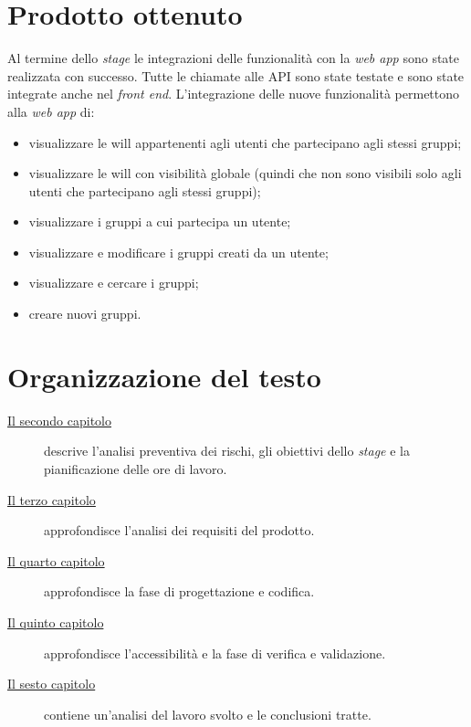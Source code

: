 \section{Prodotto ottenuto}
Al termine dello \textit{stage} le integrazioni delle funzionalità con la
\textit{web app} sono state realizzata con successo. Tutte le chiamate alle
\gls{API}
sono state testate e sono state integrate anche nel \textit{front end}.
L'integrazione delle nuove funzionalità permettono alla \textit{web app} di:
\begin{itemize}
      \item  visualizzare le \gls{will} appartenenti agli utenti che
            partecipano
            agli stessi gruppi;
      \item visualizzare le \gls{will} con visibilità globale (quindi che non
            sono visibili solo agli utenti che partecipano agli stessi gruppi);
      \item visualizzare i gruppi a cui partecipa un utente;
      \item visualizzare e modificare i gruppi creati da un utente;
      \item visualizzare e cercare i gruppi;
      \item creare nuovi gruppi.
\end{itemize}
\section{Organizzazione del testo}

\begin{description}
      \item[{\hyperref[cap:descrizione-stage]{Il secondo capitolo}}] descrive
      l'analisi preventiva dei rischi, gli obiettivi dello \textit{stage} e
      la pianificazione delle ore di lavoro.
      \item[{\hyperref[cap:analisi-requisiti]{Il terzo capitolo}}]
      approfondisce
      l'analisi dei requisiti del prodotto.

      \item[{\hyperref[cap:progettazione-codifica]{Il quarto capitolo}}]
      approfondisce la fase di progettazione e codifica.

      \item[{\hyperref[cap:verifica-validazione]{Il quinto capitolo}}]
      approfondisce l'accessibilità e la fase di verifica e validazione.

      \item[{\hyperref[cap:conclusioni]{Il sesto capitolo}}] contiene
      un’analisi
      del lavoro svolto e le conclusioni tratte.
\end{description}

